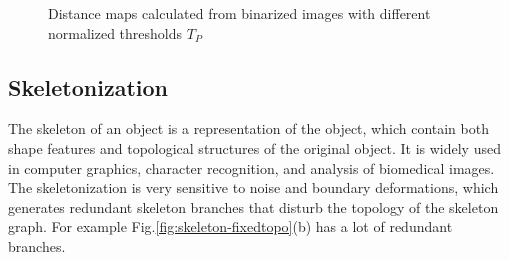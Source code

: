 \begin{figure}[h]
\begin{minipage}{0.5\textwidth}
\hspace{1pt}
\end{minipage}

\caption[Distance map - Actin]{ Distance maps calculated from binarized images
with different normalized thresholds $T_P$}
\label{fig:distancemap}
\end{figure}
 
\subsection{Skeletonization}
The skeleton of an object is a representation of the object, which contain both
shape features and topological structures of the original object. It is widely
used in computer graphics, character recognition, and analysis of biomedical
images.\citep{bai_skeleton_2007,golland_fixed_2000,ge_generation_1996} The
skeletonization is very sensitive to noise and boundary deformations, which generates redundant skeleton branches that disturb the
topology of the skeleton graph. For example Fig.\ref{fig:skeleton-fixedtopo}(b)
has a lot of redundant branches.

